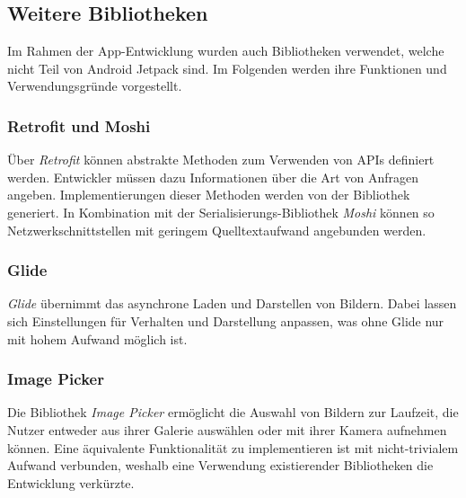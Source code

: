 \documentclass[a4paper, 11pt]{article}
\begin{document}
\subsection{Weitere Bibliotheken}
\label{subsec:app:bibs}

Im Rahmen der App-Entwicklung wurden auch Bibliotheken verwendet, welche nicht Teil von Android Jetpack sind.
Im Folgenden werden ihre Funktionen und Verwendungsgründe vorgestellt.

\subsubsection{Retrofit und Moshi}
\label{subsubsec:app:bibs:retrofitmoshi}

Über \textit{Retrofit} können abstrakte Methoden zum Verwenden von APIs definiert werden.
Entwickler müssen dazu Informationen über die Art von Anfragen angeben.
Implementierungen dieser Methoden werden von der Bibliothek generiert.
In Kombination mit der Serialisierungs-Bibliothek \textit{Moshi} können so Netzwerkschnittstellen mit geringem Quelltextaufwand angebunden werden.

\subsubsection{Glide}
\label{subsubsec:app:bibs:glide}

\textit{Glide} übernimmt das asynchrone Laden und Darstellen von Bildern.
Dabei lassen sich Einstellungen für Verhalten und Darstellung anpassen, was ohne Glide nur mit hohem Aufwand möglich ist.

\subsubsection{Image Picker}
\label{subsubsec:app:bibs:imagepicker}

Die Bibliothek \textit{Image Picker} ermöglicht die Auswahl von Bildern zur Laufzeit, die Nutzer entweder aus ihrer Galerie auswählen oder mit ihrer Kamera aufnehmen können.
Eine äquivalente Funktionalität zu implementieren ist mit nicht-trivialem Aufwand verbunden, weshalb eine Verwendung existierender Bibliotheken die Entwicklung verkürzte.
\end{document}
